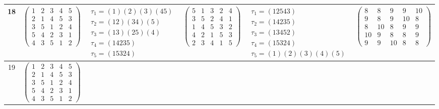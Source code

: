 \begin{longtable}{|c|p{2.7cm}|p{2.7cm}|p{2.7cm}|p{2.7cm}|p{3.3cm}|}
    \hline
    18                                                                                                                                          &
    $\begin{pmatrix}1&2&3&4&5\\2&1&4&5&3\\3&5&1&2&4\\5&4&2&3&1\\4&3&5&1&2\end{pmatrix}$                                                         &
    $\begin{array}{l}\tau_{1}=(1)(2)(3)(45)\\ \tau_{2}=(12)(34)(5)\\ \tau_{3}=(13)(25)(4)\\ \tau_{4}=(14235)\\ \tau_{5}=(15324)\end{array}$     &
    $\begin{pmatrix}5&1&3&2&4\\3&5&2&4&1\\1&4&5&3&2\\4&2&1&5&3\\2&3&4&1&5\end{pmatrix}$                                                         &
    $\begin{array}{l}\tau_{1}=(12543)\\ \tau_{2}=(14235)\\ \tau_{3}=(13452)\\ \tau_{4}=(15324)\\ \tau_{5}=(1)(2)(3)(4)(5)\end{array}$           &
    $\begin{pmatrix}8&8&9&9&10\\9&8&9&10&8\\8&10&8&9&9\\10&9&8&8&9\\9&9&10&8&8\end{pmatrix}$                                                                                                                                \\
    \hline
    19                                                                                                                                          &
    $\begin{pmatrix}1&2&3&4&5\\2&1&4&5&3\\3&5&1&2&4\\5&4&2&3&1\\4&3&5&1&2\end{pmatrix}$                                                         &

\end{longtable}
